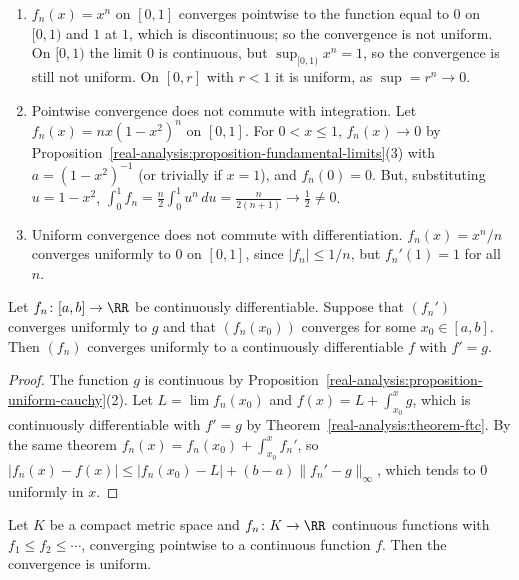 \begin{counterexample}\label{real-analysis:counterexample-pointwise}
\begin{enumerate}
\item $f_n(x) = x^n$ on $[0, 1]$ converges pointwise to the function equal to $0$ on $[0, 1)$ and $1$ at $1$, which is discontinuous; so the convergence is not uniform. On $[0, 1)$ the limit $0$ is continuous, but
$\sup_{[0,1)}x^n = 1$, so the convergence is still not uniform. On $[0, r]$ with $r < 1$ it is uniform, as $\sup = r^n \to 0$.
\item Pointwise convergence does not commute with integration. Let $f_n(x) = nx(1 - x^2)^n$ on $[0, 1]$. For $0 < x \leq 1$, $f_n(x) \to 0$ by Proposition~\ref{real-analysis:proposition-fundamental-limits}(3) with $a = (1 - x^2)^{-1}$
(or trivially if $x = 1$), and $f_n(0) = 0$. But, substituting $u = 1 - x^2$, $\int_0^1f_n = \frac n2\int_0^1u^n\,du = \frac{n}{2(n + 1)} \to \frac12 \neq 0$.
\item Uniform convergence does not commute with differentiation. $f_n(x) = x^n/n$ converges uniformly to $0$ on $[0, 1]$, since $|f_n| \leq 1/n$, but $f_n'(1) = 1$ for all $n$.
\end{enumerate}
\end{counterexample}

\begin{theorem}\label{real-analysis:theorem-uniform-derivative}
Let $f_n \colon [a, b] \to \RR$ be continuously differentiable. Suppose that $(f_n')$ converges uniformly to $g$ and that $(f_n(x_0))$ converges for some $x_0 \in [a, b]$. Then $(f_n)$ converges uniformly to a continuously
differentiable $f$ with $f' = g$.
\end{theorem}

\begin{proof}
The function $g$ is continuous by Proposition~\ref{real-analysis:proposition-uniform-cauchy}(2). Let $L = \lim f_n(x_0)$ and $f(x) = L + \int_{x_0}^xg$, which is continuously differentiable with $f' = g$ by
Theorem~\ref{real-analysis:theorem-ftc}. By the same theorem $f_n(x) = f_n(x_0) + \int_{x_0}^xf_n'$, so
$|f_n(x) - f(x)| \leq |f_n(x_0) - L| + (b - a)\|f_n' - g\|_\infty$, which tends to $0$ uniformly in $x$.
\end{proof}

\begin{theorem}[Dini]\label{real-analysis:theorem-dini}
Let $K$ be a compact metric space and $f_n \colon K \to \RR$ continuous functions with $f_1 \leq f_2 \leq \cdots$, converging pointwise to a continuous function $f$. Then the convergence is uniform.
\end{theorem}

